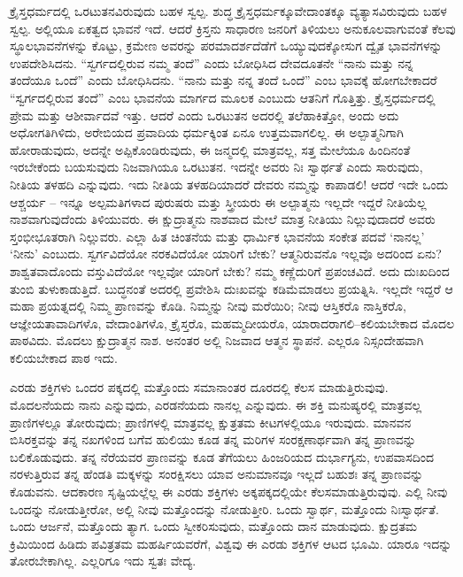 \vskip 0.2cm

ಕ್ರೈಸ್ತಧರ್ಮದಲ್ಲಿ ಒರಟುತನವಿರುವುದು ಬಹಳ ಸ್ವಲ್ಪ. ಶುದ್ಧ ಕ್ರೈಸ್ತಧರ್ಮಕ್ಕೂ\break ವೇದಾಂತಕ್ಕೂ ವ್ಯತ್ಯಾಸವಿರುವುದು ಬಹಳ ಸ್ವಲ್ಪ. ಅಲ್ಲಿಯೂ ಏಕತ್ವದ ಭಾವನೆ ಇದೆ. ಆದರೆ ಕ್ರಿಸ್ತನು ಸಾಧಾರಣ ಜನರಿಗೆ ತಿಳಿಯಲು ಅನುಕೂಲವಾಗುವಂತೆ ಕೆಲವು ಸ್ಥೂಲಭಾವನೆಗಳನ್ನು ಕೊಟ್ಟು, ಕ್ರಮೇಣ ಅವರನ್ನು ಪರಮಾದರ್ಶದೆಡೆಗೆ ಒಯ್ಯುವುದಕ್ಕೋಸುಗ ದ್ವೈತ ಭಾವನೆಗಳನ್ನು ಉಪದೇಶಿಸಿದನು. “ಸ್ವರ್ಗದಲ್ಲಿರುವ ನಮ್ಮ ತಂದೆ” ಎಂದು ಬೋಧಿಸಿದ ದೇವದೂತನೇ “ನಾನು ಮತ್ತು ನನ್ನ ತಂದೆಯೂ ಒಂದೆ” ಎಂದು ಬೋಧಿಸಿದನು. “ನಾನು ಮತ್ತು ನನ್ನ ತಂದೆ ಒಂದೆ” ಎಂಬ ಭಾವಕ್ಕೆ ಹೋಗಬೇಕಾದರೆ “ಸ್ವರ್ಗದಲ್ಲಿರುವ ತಂದೆ” ಎಂಬ ಭಾವನೆಯ ಮಾರ್ಗದ ಮೂಲಕ ಎಂಬುದು ಆತನಿಗೆ ಗೊತ್ತಿತ್ತು. ಕ್ರೈಸ್ತಧರ್ಮದಲ್ಲಿ ಪ್ರೇಮ ಮತ್ತು ಆಶೀರ್ವಾದವೆ ಇತ್ತು. ಆದರೆ ಎಂದು ಒರಟುತನ ಅದರಲ್ಲಿ ತಲೆಹಾಕಿತ್ತೋ, ಅಂದು ಅದು ಅಧೋಗತಿಗಿಳಿದು, ಅರೇಬಿಯದ ಪ್ರವಾದಿಯ ಧರ್ಮಕ್ಕಿಂತ ಏನೂ ಉತ್ತಮವಾಗಲಿಲ್ಲ. ಈ ಅಲ್ಪಾತ್ಮನಿಗಾಗಿ ಹೋರಾಡುವುದು, ಅದನ್ನೇ ಅಪ್ಪಿಕೊಂಡಿರುವುದು, ಈ ಜನ್ಮದಲ್ಲಿ ಮಾತ್ರವಲ್ಲ, ಸತ್ತ ಮೇಲೆಯೂ ಹಿಂದಿನಂತೆ ಇರಬೇಕೆಂದು ಬಯಸುವುದು ನಿಜವಾಗಿಯೂ ಒರಟುತನ. ಇದನ್ನೇ ಅವರು ನಿಃ ಸ್ವಾರ್ಥತೆ ಎಂದು ಸಾರುವುದು, ನೀತಿಯ ತಳಹದಿ ಎನ್ನುವುದು. ಇದು ನೀತಿಯ ತಳಹದಿಯಾದರೆ ದೇವರು ನಮ್ಮನ್ನು ಕಾಪಾಡಲಿ! ಆದರೆ ಇದೇ ಒಂದು ಆಶ್ಚರ್ಯ – ಇನ್ನೂ ಅಲ್ಪಮತಿಗಳಾದ ಪುರುಷರು ಮತ್ತು ಸ್ತ್ರೀಯರು ಈ ಅಲ್ಪಾತ್ಮನು ಇಲ್ಲದೇ ಇದ್ದರೆ ನೀತಿಯೆಲ್ಲ ನಾಶವಾಗುವುದೆಂದು ತಿಳಿಯುವರು. ಈ ಕ್ಷುದ್ರಾತ್ಮನು ನಾಶವಾದ ಮೇಲೆ ಮಾತ್ರ ನೀತಿಯು ನಿಲ್ಲುವುದಾದರೆ ಅವರು ಸ್ತಂಭೀಭೂತರಾಗಿ ನಿಲ್ಲುವರು. ಎಲ್ಲಾ ಹಿತ ಚಿಂತನೆಯ ಮತ್ತು ಧಾರ್ಮಿಕ ಭಾವನೆಯ ಸಂಕೇತ ಪದವೆ ‘ನಾನಲ್ಲ’ ‘ನೀನು’ ಎಂಬುದು. ಸ್ವರ್ಗವಿದೆಯೋ ನರಕವಿದೆಯೋ ಯಾರಿಗೆ ಬೇಕು? ಆತ್ಮನಿರುವನೊ ಇಲ್ಲವೊ ಅದರಿಂದ ಏನು? ಶಾಶ್ವತವಾದೊಂದು ವಸ್ತುವಿದೆಯೋ ಇಲ್ಲವೋ ಯಾರಿಗೆ ಬೇಕು? ನಮ್ಮ ಕಣ್ಣೆದುರಿಗೆ ಪ್ರಪಂಚವಿದೆ. ಅದು ದುಃಖದಿಂದ ತುಂಬಿ ತುಳುಕಾಡುತ್ತಿದೆ. ಬುದ್ಧನಂತೆ ಅದರಲ್ಲಿ ಪ್ರವೇಶಿಸಿ ದುಃಖವನ್ನು ಕಡಿಮೆಮಾಡಲು ಪ್ರಯತ್ನಿಸಿ. ಇಲ್ಲದೇ ಇದ್ದರೆ ಆ ಮಹಾ ಪ್ರಯತ್ನದಲ್ಲಿ ನಿಮ್ಮ ಪ್ರಾಣವನ್ನು ಕೊಡಿ. ನಿಮ್ಮನ್ನು ನೀವು ಮರೆಯಿರಿ; ನೀವು ಆಸ್ತಿಕರೊ ನಾಸ್ತಿಕರೊ, ಆಜ್ಞೇಯತಾವಾದಿಗಳೊ, ವೇದಾಂತಿಗಳೊ, ಕ್ರೈಸ್ತರೊ, ಮಹಮ್ಮದೀಯರೊ, ಯಾರಾದರಾಗಲಿ–ಕಲಿಯಬೇಕಾದ ಮೊದಲ ಪಾಠವಿದು. ಮೊದಲು ಕ್ಷುದ್ರಾತ್ಮನ ನಾಶ. ಅನಂತರ ಅಲ್ಲಿ ನಿಜವಾದ ಆತ್ಮನ ಸ್ಥಾಪನೆ. ಎಲ್ಲರೂ ನಿಸ್ಸಂದೇಹವಾಗಿ ಕಲಿಯಬೇಕಾದ ಪಾಠ ಇದು. 

\vskip 0.2cm

ಎರಡು ಶಕ್ತಿಗಳು ಒಂದರ ಪಕ್ಕದಲ್ಲಿ ಮತ್ತೊಂದು ಸಮಾನಾಂತರ ದೂರದಲ್ಲಿ ಕೆಲಸ ಮಾಡುತ್ತಿರುವುವು. ಮೊದಲನೆಯದು ನಾನು ಎನ್ನುವುದು, ಎರಡನೆಯದು ನಾನಲ್ಲ ಎನ್ನುವುದು. ಈ ಶಕ್ತಿ ಮನುಷ್ಯರಲ್ಲಿ ಮಾತ್ರವಲ್ಲ ಪ್ರಾಣಿಗಳಲ್ಲೂ ತೋರುವುದು; ಪ್ರಾಣಿಗಳಲ್ಲಿ ಮಾತ್ರವಲ್ಲ ಕ್ಷುತ್ರತಮ ಕೀಟಗಳಲ್ಲಿಯೂ ಇರುವುದು. ಮಾನವನ ಬಿಸಿರಕ್ತವನ್ನು ತನ್ನ ನಖಗಳಿಂದ ಬಗೆವ ಹುಲಿಯು ಕೂಡ ತನ್ನ ಮರಿಗಳ ಸಂರಕ್ಷಣಾರ್ಥವಾಗಿ ತನ್ನ ಪ್ರಾಣವನ್ನು ಬಲಿಕೊಡುವುದು. ತನ್ನ ನೆರೆಯವರ ಪ್ರಾಣವನ್ನು ಕೂಡ ತೆಗೆಯಲು ಹಿಂಜರಿಯದ ದುರ್ಭಾಗ್ಯನು, ಉಪವಾಸದಿಂದ ನರಳುತ್ತಿರುವ ತನ್ನ ಹೆಂಡತಿ ಮಕ್ಕಳನ್ನು ಸಂರಕ್ಷಿಸಲು ಯಾವ ಅನುಮಾನವೂ ಇಲ್ಲದೆ ಬಹುಶಃ ತನ್ನ ಪ್ರಾಣವನ್ನು ಕೊಡುವನು. ಆದಕಾರಣ ಸೃಷ್ಟಿಯಲ್ಲೆಲ್ಲ ಈ ಎರಡು ಶಕ್ತಿಗಳು ಅಕ್ಕಪಕ್ಕದಲ್ಲಿಯೇ ಕೆಲಸಮಾಡುತ್ತಿರುವುವು. ಎಲ್ಲಿ ನೀವು ಒಂದನ್ನು ನೋಡುತ್ತೀರೋ, ಅಲ್ಲಿ ನೀವು ಮತ್ತೊಂದನ್ನು ನೋಡುತ್ತೀರಿ. ಒಂದು ಸ್ವಾರ್ಥ, ಮತ್ತೊಂದು ನಿಃಸ್ವಾರ್ಥತೆ. ಒಂದು ಆರ್ಜನೆ, ಮತ್ತೊಂದು ತ್ಯಾಗ. ಒಂದು ಸ್ವೀಕರಿಸುವುದು, ಮತ್ತೊಂದು ದಾನ ಮಾಡುವುದು. ಕ್ಷುದ್ರತಮ ಕ್ರಿಮಿಯಿಂದ ಹಿಡಿದು ಪವಿತ್ರತಮ ಮಹರ್ಷಿಯವರೆಗೆ, ವಿಶ್ವವು ಈ ಎರಡು ಶಕ್ತಿಗಳ ಆಟದ ಭೂಮಿ. ಯಾರೂ ಇದನ್ನು ತೋರಬೇಕಾಗಿಲ್ಲ. ಎಲ್ಲರಿಗೂ ಇದು ಸ್ವತಃ ವೇದ್ಯ. 

